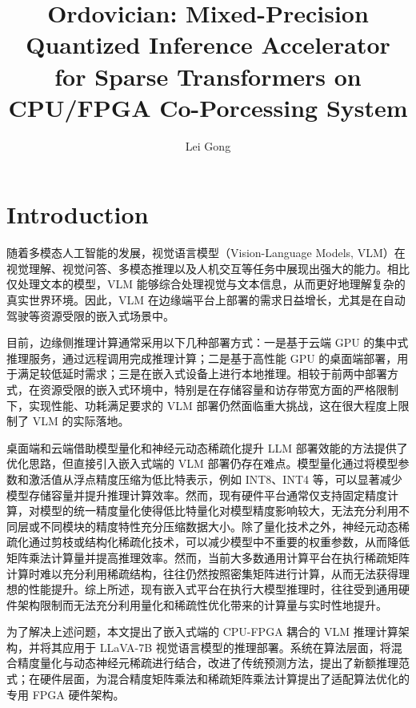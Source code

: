 \documentclass[sigconf]{acmart}
\title{Ordovician: Mixed-Precision Quantized Inference Accelerator for Sparse Transformers on CPU/FPGA Co-Porcessing System}
\author{Lei Gong}
\affiliation{
	\institution{University of Science and Technology of China}
	\city{Hefei}
	\country{China}
}
\begin{document}
	
	\begin{abstract}
	\end{abstract}
	
	
	\maketitle
	
	\section{Introduction}
	随着多模态人工智能的发展，视觉语言模型（Vision-Language Models, VLM）在视觉理解、视觉问答、多模态推理以及人机交互等任务中展现出强大的能力。相比仅处理文本的模型，VLM 能够综合处理视觉与文本信息，从而更好地理解复杂的真实世界环境。因此，VLM 在边缘端平台上部署的需求日益增长，尤其是在自动驾驶等资源受限的嵌入式场景中。

	目前，边缘侧推理计算通常采用以下几种部署方式：一是基于云端 GPU 的集中式推理服务，通过远程调用完成推理计算；二是基于高性能 GPU 的桌面端部署，用于满足较低延时需求；三是在嵌入式设备上进行本地推理。相较于前两中部署方式，在资源受限的嵌入式环境中，特别是在存储容量和访存带宽方面的严格限制下，实现性能、功耗满足要求的 VLM 部署仍然面临重大挑战，这在很大程度上限制了 VLM 的实际落地。

	桌面端和云端借助模型量化和神经元动态稀疏化提升 LLM 部署效能的方法提供了优化思路，但直接引入嵌入式端的 VLM 部署仍存在难点。模型量化通过将模型参数和激活值从浮点精度压缩为低比特表示，例如 INT8、INT4 等，可以显著减少模型存储容量并提升推理计算效率。然而，现有硬件平台通常仅支持固定精度计算，对模型的统一精度量化使得低比特量化对模型精度影响较大，无法充分利用不同层或不同模块的精度特性充分压缩数据大小。除了量化技术之外，神经元动态稀疏化通过剪枝或结构化稀疏化技术，可以减少模型中不重要的权重参数，从而降低矩阵乘法计算量并提高推理效率。然而，当前大多数通用计算平台在执行稀疏矩阵计算时难以充分利用稀疏结构，往往仍然按照密集矩阵进行计算，从而无法获得理想的性能提升。综上所述，现有嵌入式平台在执行大模型推理时，往往受到通用硬件架构限制而无法充分利用量化和稀疏性优化带来的计算量与实时性地提升。
	
	为了解决上述问题，本文提出了嵌入式端的 CPU-FPGA 耦合的 VLM 推理计算架构，并将其应用于 LLaVA-7B 视觉语言模型的推理部署。系统在算法层面，将混合精度量化与动态神经元稀疏进行结合，改进了传统预测方法，提出了新额推理范式；在硬件层面，为混合精度矩阵乘法和稀疏矩阵乘法计算提出了适配算法优化的专用 FPGA 硬件架构。
	
\end{document}
